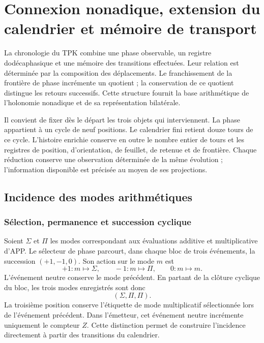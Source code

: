 \section{Connexion nonadique, extension du calendrier et mémoire de transport}
\label{cap:calendario}

La chronologie du TPK combine une phase observable, un registre dodécaphasique
et une mémoire des transitions effectuées. Leur relation est déterminée par
la composition des déplacements. Le franchissement de la frontière de phase
incrémente un quotient ; la conservation de ce quotient distingue les
retours successifs. Cette structure fournit la base arithmétique de
l’holonomie nonadique et de sa représentation bilatérale.

Il convient de fixer dès le départ les trois objets qui interviennent. La phase
appartient à un cycle de neuf positions. Le calendrier fini retient douze
tours de ce cycle. L’histoire enrichie conserve en outre le nombre
entier de tours et les registres de position, d’orientation, de feuillet, de retenue et de
frontière. Chaque réduction conserve une observation déterminée de la même
évolution ; l’information disponible est précisée au moyen de ses projections.

\subsection{Incidence des modes arithmétiques}
\label{sec:cal-incidencia}

\subsubsection{Sélection, permanence et succession cyclique}

Soient $\Sigma$ et $\Pi$ les modes correspondant aux évaluations additive
et multiplicative d’APP. Le sélecteur de phase parcourt, dans chaque bloc de trois
événements, la succession $(+1,-1,0)$. Son action sur le mode $m$ est
\[
 +1:m\longmapsto\Sigma,\qquad
 -1:m\longmapsto\Pi,\qquad
 0:m\longmapsto m.
\]
L’événement neutre conserve le mode précédent. En partant de la clôture cyclique
du bloc, les trois modes enregistrés sont donc
\[
 (\Sigma,\Pi,\Pi).
\]
La troisième position conserve l’étiquette de mode multiplicatif
sélectionnée lors de l’événement précédent. Dans l’émetteur, cet événement neutre
incrémente uniquement le compteur $Z$. Cette distinction permet de
construire l’incidence directement à partir des transitions du calendrier.

